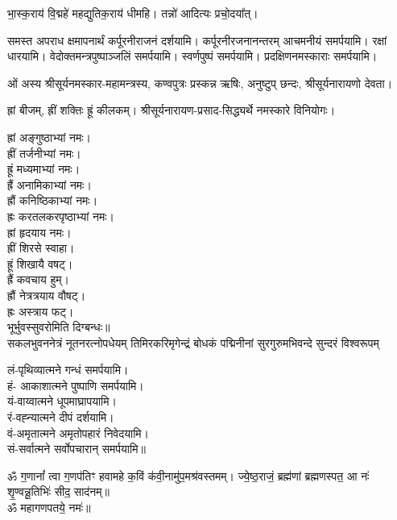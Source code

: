 भा॒स्क॒राय॑ वि॒द्महे॑ महद्युतिक॒राय॑ धीमहि। 
तन्नो॑ आदित्यः प्रचो॒दया᳚त्। 

\devAya{} समस्त अपराध क्षमापनार्थं कर्पूरनीराजनं दर्शयामि। कर्पूरनीरजनानन्तरम् आचमनीयं समर्पयामि। रक्षां धारयामि।
\devAya{} वेदोक्तमन्त्रपुष्पाञ्जलिं समर्पयामि। स्वर्णपुष्पं समर्पयामि।
\devAya{} प्रदक्षिणनमस्काराः समर्पयामि।


ओं अस्य श्रीसूर्यनमस्कार-महामन्त्रस्य, कण्वपुत्रः प्रस्कन्न ऋषिः, अनुष्टुप् छन्दः, श्रीसूर्यनारायणो देवता।

ह्रां बीजम्, ह्रीं शक्तिः ह्रूं कीलकम्। श्रीसूर्यनारायण-प्रसाद-सिद्ध्यर्थे नमस्कारे विनियोगः।

ह्रां अङ्गुष्ठाभ्यां नमः।\\
ह्रीं तर्जनीभ्यां नमः।\\
ह्रूं मध्यमाभ्यां नमः।\\
ह्रैं अनामिकाभ्यां नमः।\\
ह्रौं कनिष्ठिकाभ्यां नमः।\\
ह्रः करतलकरपृष्ठाभ्यां नमः।\\

ह्रां हृदयाय नमः।\\
ह्रीं शिरसे स्वाहा।\\
ह्रूं शिखायै वषट्।\\
ह्रैं कवचाय हुम्।\\
ह्रौं नेत्रत्रयाय वौषट्।\\
ह्रः अस्त्राय फट्।\\

भूर्भुवस्सुवरोमिति दिग्बन्धः॥\\

{सकलभुवननेत्रं नूतनरत्नोपधेयम्}
{तिमिरकरिमृगेन्द्रं बोधकं पद्मिनीनां}
{सुरगुरुमभिवन्दे सुन्दरं विश्वरूपम्}

लं-पृथिव्यात्मने गन्धं समर्पयामि।\\
हं- आकाशात्मने पुष्पाणि समर्पयामि।\\
यं-वाय्वात्मने धूपमाघ्रापयामि।\\
रं-वह्न्यात्मने दीपं दर्शयामि।\\
वं-अमृतात्मने अमृतोपहारं निवेदयामि।\\
सं-सर्वात्मने सर्वोपचारान् समर्पयामि॥\\



ॐ ग॒णानां᳚ त्वा ग॒णप॑तिꣳ हवामहे क॒विं क॑वी॒नामु॑प॒मश्र॑\-वस्तमम्। 
ज्ये॒ष्ठ॒राजं॒ ब्रह्म॑णां ब्रह्मणस्पत॒ आ नः॑ शृ॒ण्वन्नू॒तिभिः॑ सीद॒ साद॑नम्॥\\
ॐ महागणपतये॒ नमः॑॥ 

